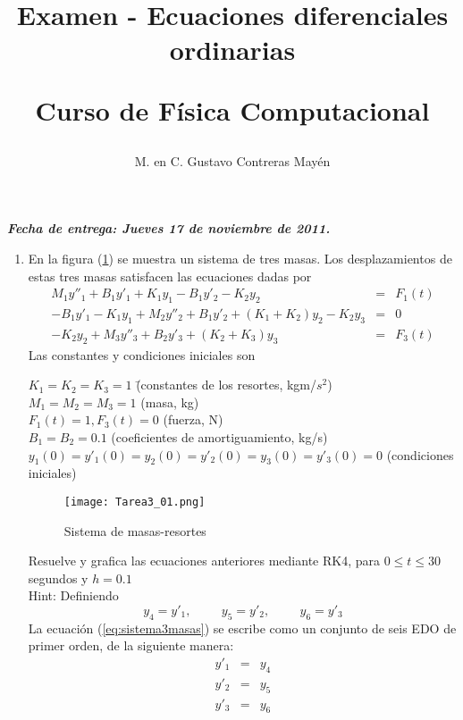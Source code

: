 \documentclass[letterpaper]{article}
\title{Examen - Ecuaciones diferenciales ordinarias \\ \begin{large}Curso de Física Computacional\end{large}}
\author{M. en C. Gustavo Contreras Mayén}
\date{ }
\begin{document}
\maketitle
\textbf{\textit{Fecha de entrega: Jueves 17 de noviembre de 2011.}}
\begin{enumerate}
\item En la figura (\ref{fig:sistemamecanico}) se muestra un sistema de tres masas. Los desplazamientos de estas tres masas satisfacen las ecuaciones dadas por
\begin{eqnarray} 
M_{1} y''_{1} + B_{1} y'_{1} + K_{1} y_{1} - B_{1} y'_{2} - K_{2}y_{2} & = & F_{1}(t) \nonumber \\
-B_{1} y'_{1} - K_{1} y_{1} + M_{2} y''_{2} + B_{1} y'_{2} + (K_{1} + K_{2}) y_{2} - K_{2} y_{3} & = & 0 \label{eq:sistema3masas} \\
-K_{2} y_{2} + M_{3} y''_{3} + B_{2} y'_{3} + (K_{2} + K_{3}) y_{3} & = & F_{3}(t) \nonumber
\end{eqnarray}
Las constantes y condiciones iniciales son
\begin{tabbing}
$K_{1} = K_{2} = K_{3} = 1$ \hspace{5.5cm} \= (constantes de los resortes, kgm/$s^{2}$) \\
$M_{1} = M_{2} = M_{3} = 1$ \> (masa, kg) \\
$F_{1}(t) = 1, F_{3}(t) = 0$ \> (fuerza, N) \\
$B_{1} = B_{2} =0.1$ \> (coeficientes de amortiguamiento, kg/s) \\
$y_{1}(0) = y'_{1}(0) = y_{2}(0) = y'_{2}(0) = y_{3}(0) = y'_{3}(0) = 0$ \> (condiciones iniciales)
\end{tabbing}
\begin{figure}[!h]
	\centering	
	\texttt{[image: Tarea3\_01.png]}
	\label{fig:sistemamecanico}
	\caption{Sistema de masas-resortes}
\end{figure}
Resuelve y grafica las ecuaciones anteriores mediante RK4, para $0 \leq t \leq 30$ segundos y $h=0.1$ \\
Hint: Definiendo
\[ y_{4} = y'_{1}, \hspace{1cm} y_{5} = y'_{2}, \hspace{1cm} y_{6} = y'_{3} \]
La ecuación (\ref{eq:sistema3masas}) se escribe como un conjunto de seis EDO de primer orden, de la siguiente manera:
\begin{eqnarray}
y'_{1} & = & y_{4} \\
y'_{2} & = & y_{5} \\
y'_{3} & = & y_{6} \\

\end{eqnarray}
\end{enumerate}
\end{document}
